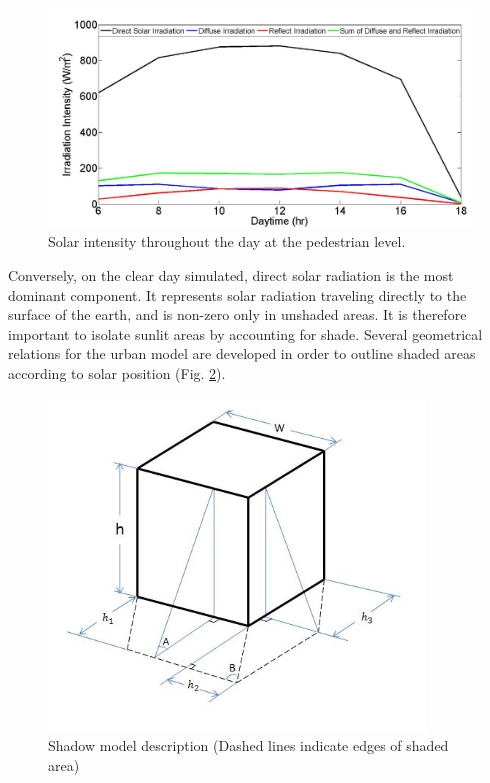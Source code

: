 \documentclass[preprint,3p,12pt,english]{elsarticle}
\begin{document}
\begin{figure}[H]
\graphicspath{ {image/} }
\centerline{\includegraphics[width=14cm]{SolarIntensity.jpg}}
\caption{Solar intensity throughout the day at the pedestrian level.}
\label{Fig.SolarIntensity}
\end{figure}

Conversely, on the clear day simulated, direct solar radiation is the most dominant component. It represents solar radiation traveling directly to the surface of the earth, and is non-zero only in unshaded areas. It is therefore important to isolate sunlit areas by accounting for shade. Several geometrical relations for the urban model are developed in order to outline shaded areas according to solar position (Fig. \ref{Fig.Shadow}). 
\begin{figure}[H]
\graphicspath{ {image/} }
\centerline{\includegraphics[width=10cm]{SVFModel.JPG}}
\caption{Shadow model description (Dashed lines indicate edges of shaded area)}
\label{Fig.Shadow}
\end{figure}
\end{document}
